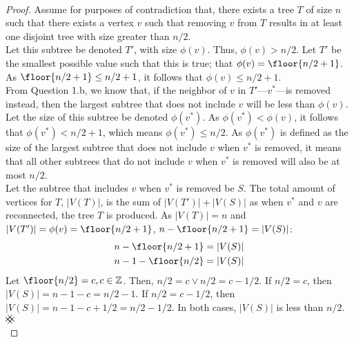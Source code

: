 \documentclass[11pt]{scrartcl}
\theoremstyle{dotlessP}
\theoremstyle{dotlessN}
\newcommand{\ints}{\mathbb{Z}}
\newcommand{\contradiction}{{\hbox{%
    \setbox0=\hbox{$\mkern-3mu\times\mkern-3mu$}%
    \setbox1=\hbox to0pt{\hss$\times$\hss}%
    \copy0\raisebox{0.5\wd0}{\copy1}\raisebox{-0.5\wd0}{\box1}\box0
}}}
\begin{document}
\begin{ans}
	\
	\begin{proof}
		Assume for purposes of contradiction that, there exists a tree $T$ of size $n$ such that there exists a vertex $v$ such that removing $v$ from $T$ results in at least one disjoint tree with size greater than $n/2$.
		\\

		Let this subtree be denoted $T'$, with size $\phi(v)$. Thus, $\phi(v) > n/2$. Let $T'$ be the smallest possible value such that this is true; that $\phi(v) = \floor{n/2 + 1}$. As $\floor{n/2 + 1} \leq n/2 + 1$, it follows that $\phi(v) \leq n/2 + 1$. 
\\

		From Question 1.b, we know that, if the neighbor of $v$ in $T'$---$v^*$---is removed instead, then the largest subtree that does not include $v$ will be less than  $\phi(v)$. Let the size of this subtree be denoted $\phi(v^*)$. As  $\phi(v^*) < \phi(v)$, it follows that $\phi(v^*) < n/2 + 1$, which means $\phi(v^*) \leq n/2$. As $\phi(v^*)$ is defined as the size of the largest subtree that does not include $v$ when $v^*$ is removed, it means that all other subtrees that do not include $v$ when $v^*$ is removed will also be at most $n/2$. 
		\\

		Let the subtree that includes $v$ when $v^*$ is removed be $S$. The total amount of vertices for $T$, $|V(T)|$, is the sum of $|V(T')| + |V(S)|$ as when $v^*$ and $v$ are reconnected, the tree $T$ is produced. As $|V(T)| = n$ and $|V(T')| = \phi(v) = \floor{n/2 + 1}$, $n - \floor{n/2 + 1} = |V(S)|$:
		\begin{align*}
			n - \floor{n/2 + 1} &= |V(S)| \\
			n - 1 - \floor{n/2} &= |V(S)|
		\end{align*}
		Let $\floor{n/2} = c, c \in \ints$. Then, $n/2 = c \lor n/2 = c - 1/2$. If $n/2 = c$, then $|V(S)| = n - 1 - c = n/2 - 1$. If $n/2 = c - 1/2$, then $|V(S)| = n - 1 - c + 1/2 = n/2 - 1/2$. In both cases, $|V(S)|$ is less than $n/2$. $\contradiction$
		\\


\end{proof}
\end{ans}
\end{document}

